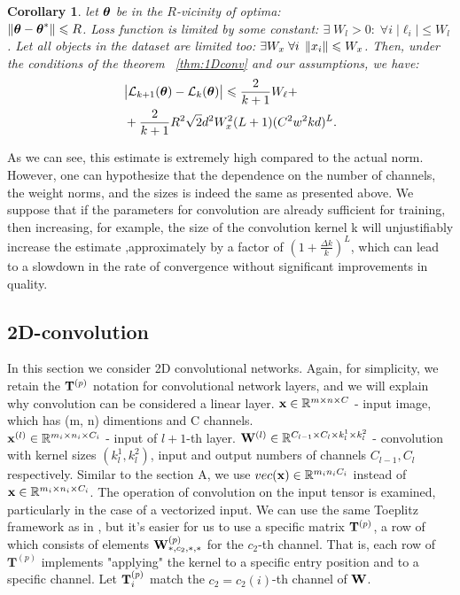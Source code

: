 \documentclass[conference]{IEEEtran}
\newtheorem{corollary}{Corollary}
\begin{document}
\begin{corollary}
let $\boldsymbol{\theta}$ be in the $R$-vicinity of optima: \\ $\left\|\boldsymbol{\theta} - \boldsymbol{\theta}^*\right\| \leqslant R$. Loss function is limited by some constant: $\exists \; W_l > 0: \; \forall i\; |\ell_i| \leqslant W_l$. Let all objects in the dataset are limited too: $\exists W_x\; \forall i \; \left\|x_i\right\| \leqslant W_x$. Then, under the conditions of the theorem ~\ref{thm:1Dconv} and our assumptions, we have:
\begin{align*}
& \big|\mathcal{L}_{k+1}(\boldsymbol{\theta}) - \mathcal{L}_{k}(\boldsymbol{\theta})\big| \leqslant \frac{2}{k+1}W_{\ell} +\\
& + \frac{2}{k+1}R^2\sqrt{2}d^2W_x^2(L+1)(C^2w^2kd)^L.
\end{align*}
\end{corollary}

As we can see, this estimate is extremely high compared to the actual norm. However, one can hypothesize that the dependence on the number of channels, the weight norms, and the sizes is indeed the same as presented above. We suppose that if the parameters for convolution are already sufficient for training, then increasing, for example, the size of the convolution kernel k will unjustifiably increase the estimate ,approximately by a factor of $(1 + \frac{\Delta k}{k})^L$, which can lead to a slowdown in the rate of convergence without significant improvements in quality.

\subsection{2D-convolution}\label{sec:2d-conv}
In this section we consider 2D convolutional networks. Again, for simplicity, we retain the $\mathbf{T}^{(p)}$ notation for convolutional network layers, and we will explain why convolution can be considered a linear layer. $\mathbf{x} \in \mathbb{R}^{m \times n \times C}$ - input image, which has (m, n) dimentions and C channels. \\
$\mathbf{x}^{(l)} \in \mathbb{R}^{m_i \times n_i \times C_i}$ - input of $l+1$-th layer. 
$\mathbf{W}^{(l)} \in \mathbb{R}^{C_{l-1} \times C_l \times k^1_l \times k^2_l}$ - convolution with kernel sizes $(k^1_l, k^2_l)$, input and output numbers of channels $C_{l-1}, C_l$ respectively. 
Similar to the section A, we use $vec(\mathbf{x}) \in \mathbb{R}^{m_in_iC_i}$ instead of $\mathbf{x} \in \mathbb{R}^{m_i \times n_i \times C_i}$.
The operation of convolution on the input tensor is examined, particularly in the case of a vectorized input. We can use the same Toeplitz framework as in \cite{toep_2dconv}, but it's easier for us to use a specific matrix $\mathbf{T}^{(p)}$, a row of which consists of elements $\mathbf{W}^{(p)}_{*, c_2, *, *}$ for the $c_2$-th channel. That is, each row of $\mathbf{T}^{(p)}$ implements "applying" the kernel to a specific entry position and to a specific channel. Let $\mathbf{T}^{(p)}_i$ match the $c_2 = c_2(i)$-th channel of $\mathbf{W}$.
\end{document}
